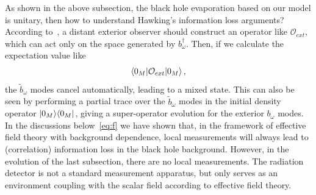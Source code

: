\documentclass[12pt,a4paper]{article}
\begin{document}
As shown in the above subsection, the black hole evaporation based on our model is
unitary, then how to understand Hawking's information loss
arguments? According to~\cite{a}, a distant exterior observer
should construct an operator like $\mathcal {O}_{ext}$, which can act
only on the space generated by $b_{\omega}^{\dag}$. Then, if we
calculate the expectation value like
\begin{equation}
\label{eq:39}
\begin{split}
\langle0_M\arrowvert\mathcal {O}_{ext}\arrowvert0_M\rangle \,,
\end{split}
\end{equation}
the $\tilde{b}_{\omega}$ modes cancel automatically, leading to a
mixed state. This can also be seen by performing a partial trace
over the $\tilde{b}_{\omega}$ modes in the initial density operator
$\arrowvert0_M\rangle\langle0_M\arrowvert$, giving a super-operator
evolution for the exterior $b_{\omega}$ modes. In the discussions below~\eqref{eq:f} we have shown that, in the framework of effective field theory with background dependence, local measurements will always lead to (correlation) information loss in the black hole background. However, in the evolution of the last subsection, there are no local measurements. The radiation detector is not a standard measurement apparatus, but only serves as an environment coupling with the scalar field according to effective field theory.
\end{document}

